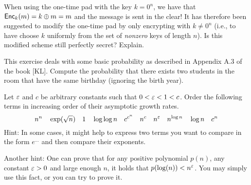 \documentclass[a4paper,10pt,landscape,twocolumn]{scrartcl}
\begin{document}
\begin{exercise}
When using the one-time pad with the key $k=0^n$, we have that $\mathsf{Enc}_k(m)=k \oplus m = m$ and the message is sent in the clear! It has therefore been suggested to modify the one-time pad by only encrypting with $k \neq 0^n$ (i.e., to have \gen choose $k$ uniformly from the set of \emph{nonzero} keys of length $n$). Is this modified scheme still perfectly secret? Explain.
\end{exercise}

\begin{exercise}
This exercise deals with some basic probability as described in Appendix A.3 of the book [KL]. Compute the probability that there exists two students in the room that have the same birthday (ignoring the birth year).
\end{exercise}

\begin{exercise}
Let $\varepsilon$ and $c$ be arbitrary constants such that $0<\varepsilon<1<c$. Order the following terms in increasing order of their
  asymptotic growth rates.
\[ n^n \quad \exp(\sqrt{n}) \quad 1 \quad \log\log n \quad
c^{c^n} \quad n^c \quad n^\varepsilon \quad n^{\log n} \quad \log n \quad c^n
\]
{\small Hint: In some cases, it might help to express two terms you
  want to compare in the form $e^{\ldots}$ and then compare their
  exponents.}

{\small Another hint: One can prove that for any positive polynomial
  $p(n)$, any constant $\varepsilon>0$ and large enough $n$, it holds that
  $p(\log(n)) < n^\varepsilon$. You may simply use this fact, or you can try
  to prove it.}
\end{exercise}
\end{document}
